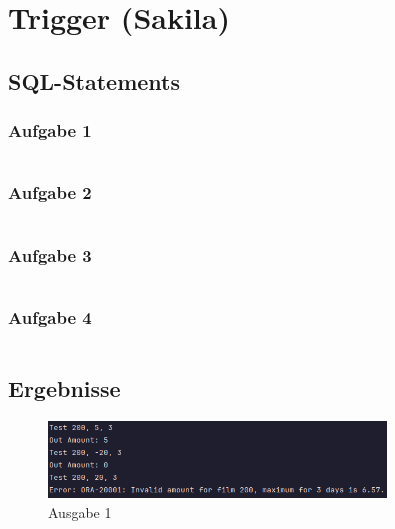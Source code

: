 \documentclass[12pt]{scrartcl}
\begin{document}

\section{Trigger (Sakila)}

\subsection{SQL-Statements}

\subsubsection{Aufgabe 1}
\inputminted{sql}{../ue5_1_1.sql}

\subsubsection{Aufgabe 2}
\inputminted{sql}{../ue5_1_2.sql}

\subsubsection{Aufgabe 3}
\inputminted{sql}{../ue5_1_3.sql}

\subsubsection{Aufgabe 4}
\inputminted{sql}{../ue5_1_4.sql}

\subsection{Ergebnisse}

\begin{figure}[H]
	\centering
	\includegraphics[width=0.8\textwidth]{../1_1.png}
	\caption{Ausgabe 1}
\end{figure}
\end{document}
